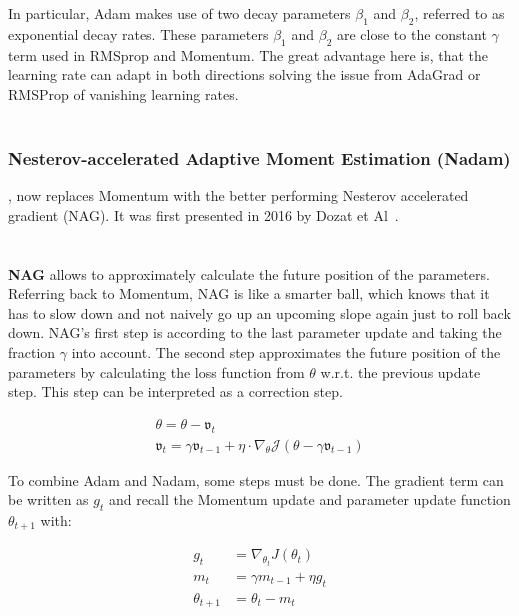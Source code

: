 In particular, Adam makes use of two decay parameters $\beta_1$ and $\beta_2$, referred to as exponential decay rates.
These parameters $\beta_1$ and $\beta_2$ are close to the constant $\gamma$ term used in RMSprop and Momentum.
The great advantage here is, that the learning rate can adapt in both directions solving the issue from AdaGrad or
RMSProp of vanishing learning rates.
\\\mbox{}\\
\subsubsection{Nesterov-accelerated Adaptive Moment Estimation (Nadam)},
now replaces Momentum with the better performing
Nesterov accelerated gradient (NAG).
It was first presented in 2016 by Dozat et Al~\cite{nadam}.\\
\\\mbox{}\\
\textbf{NAG} allows to approximately calculate the future position of the parameters.
Referring back to Momentum, NAG is like a smarter ball, which knows that it has to slow down and not naively go up an upcoming
slope again just to roll back down.
NAG's first step is according to the last parameter update and taking the fraction $\gamma$ into account.
The second step approximates the future position of the parameters by calculating the loss function from $\theta$ w.r.t.
the previous update step.
This step can be interpreted as a correction step.

\begin{align}
    \theta = \theta - \mathfrak{v}_t \label{eqn:nag:1}\\
    \mathfrak{v}_t = \gamma\mathfrak{v}_{t-1} + \eta\cdot\nabla_\theta\mathcal{J}(\theta-\gamma\mathfrak{v}_{t-1}) \label{eqn:nag:2}
\end{align}

To combine Adam and Nadam, some steps must be done.
The gradient term can be written as $g_t$ and recall the Momentum update and parameter update function $\theta_{t+1}$ with:

\begin{align}
g_t &= \nabla_{\theta_t}J(\theta_t) \label{eqn:nadam:1} \\
m_t &= \gamma m_{t-1} + \eta g_t \label{eqn:nadam:2}\\
\theta_{t+1} &= \theta_t - m_t \label{eqn:nadam:3}
\end{align}

